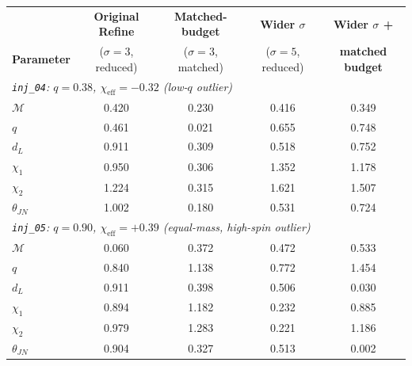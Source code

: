 \documentclass[12pt]{article}
\begin{document}
\begin{table}[htbp]
    \centering
    \small
    \begin{tabular}{l c c c c}
        \hline\hline
         & \textbf{Original Refine} & \textbf{Matched-budget} & \textbf{Wider $\sigma$} & \textbf{Wider $\sigma$ +} \\
        \textbf{Parameter} & ($\sigma\!=\!3$, reduced) & ($\sigma\!=\!3$, matched) & ($\sigma\!=\!5$, reduced) & \textbf{matched budget} \\
        \hline
        \multicolumn{5}{l}{\emph{\texttt{inj\_04}: $q=0.38$, $\chi_{\mathrm{eff}}=-0.32$ (low-$q$ outlier)}} \\
        $\mathcal{M}$  & 0.420 & 0.230 & 0.416 & 0.349 \\
        $q$            & 0.461 & 0.021 & 0.655 & 0.748 \\
        $d_L$          & 0.911 & 0.309 & 0.518 & 0.752 \\
        $\chi_1$       & 0.950 & 0.306 & 1.352 & 1.178 \\
        $\chi_2$       & 1.224 & 0.315 & 1.621 & 1.507 \\
        $\theta_{JN}$  & 1.002 & 0.180 & 0.531 & 0.724 \\
        \hline
        \multicolumn{5}{l}{\emph{\texttt{inj\_05}: $q=0.90$, $\chi_{\mathrm{eff}}=+0.39$ (equal-mass, high-spin outlier)}} \\
        $\mathcal{M}$  & 0.060 & 0.372 & 0.472 & 0.533 \\
        $q$            & 0.840 & 1.138 & 0.772 & 1.454 \\
        $d_L$          & 0.911 & 0.398 & 0.506 & 0.030 \\
        $\chi_1$       & 0.894 & 1.182 & 0.232 & 0.885 \\
        $\chi_2$       & 0.979 & 1.283 & 0.221 & 1.186 \\
        $\theta_{JN}$  & 0.904 & 0.327 & 0.513 & 0.002 \\
        \hline\hline
    \end{tabular}

\end{table}
\end{document}

